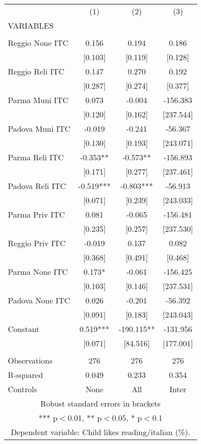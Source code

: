 \begin{tabular}{lccc} \hline
 & (1) & (2) & (3) \\
VARIABLES &  &  &  \\ \hline
 &  &  &  \\
Reggio None ITC & 0.156 & 0.194 & 0.186 \\
 & [0.103] & [0.119] & [0.128] \\
Reggio Reli ITC & 0.147 & 0.270 & 0.192 \\
 & [0.287] & [0.274] & [0.377] \\
Parma Muni ITC & 0.073 & -0.004 & -156.383 \\
 & [0.120] & [0.162] & [237.544] \\
Padova Muni ITC & -0.019 & -0.241 & -56.367 \\
 & [0.130] & [0.193] & [243.071] \\
Parma Reli ITC & -0.353** & -0.573** & -156.893 \\
 & [0.171] & [0.277] & [237.461] \\
Padova Reli ITC & -0.519*** & -0.803*** & -56.913 \\
 & [0.071] & [0.239] & [243.033] \\
Parma Priv ITC & 0.081 & -0.065 & -156.481 \\
 & [0.235] & [0.257] & [237.530] \\
Reggio Priv ITC & -0.019 & 0.137 & 0.082 \\
 & [0.368] & [0.491] & [0.468] \\
Parma None ITC & 0.173* & -0.061 & -156.425 \\
 & [0.103] & [0.146] & [237.531] \\
Padova None ITC & 0.026 & -0.201 & -56.392 \\
 & [0.091] & [0.183] & [243.043] \\
Constant & 0.519*** & -190.115** & -131.956 \\
 & [0.071] & [84.516] & [177.001] \\
 &  &  &  \\
Observations & 276 & 276 & 276 \\
R-squared & 0.049 & 0.233 & 0.354 \\
 Controls & None & All & Inter \\ \hline
\multicolumn{4}{c}{ Robust standard errors in brackets} \\
\multicolumn{4}{c}{ *** p$<$0.01, ** p$<$0.05, * p$<$0.1} \\
\multicolumn{4}{c}{ Dependent variable: Child likes reading/italian (\%).} \\
\end{tabular}
